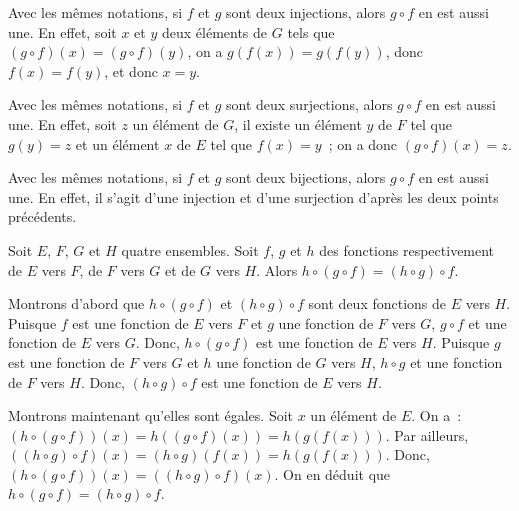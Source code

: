 \done

\blank[medium]

\noindent{} Avec les mêmes notations, si $f$ et $g$ sont deux injections, alors $g \circ f$ en est aussi une. 
    En effet, soit $x$ et $y$ deux éléments de $G$ tels que $(g \circ f)(x) = (g \circ f)(y)$, on a $g(f(x)) = g(f(y))$, donc $f(x) = f(y)$, et donc $x = y$.

\blank[medium]

\noindent{} Avec les mêmes notations, si $f$ et $g$ sont deux surjections, alors $g \circ f$ en est aussi une. 
    En effet, soit $z$ un élément de $G$, il existe un élément $y$ de $F$ tel que $g(y) = z$ et un élément $x$ de $E$ tel que $f(x) = y$ ; on a donc $(g \circ f)(x) = z$.

\blank[medium]

\noindent{} Avec les mêmes notations, si $f$ et $g$ sont deux bijections, alors $g \circ f$ en est aussi une. 
    En effet, il s'agit d'une injection et d'une surjection d'après les deux points précédents.

\blank[medium]

\noindent{} Soit $E$, $F$, $G$ et $H$ quatre ensembles. 
    Soit $f$, $g$ et $h$ des fonctions respectivement de $E$ vers $F$, de $F$ vers $G$ et de $G$ vers $H$. 
    Alors $h \circ (g \circ f) = (h \circ g) \circ f$.

\blank[medium]

\noindent{} Montrons d'abord que $h \circ (g \circ f)$ et $(h \circ g) \circ f$ sont deux fonctions de $E$ vers $H$. 
    Puisque $f$ est une fonction de $E$ vers $F$ et $g$ une fonction de $F$ vers $G$, $g \circ f$ et une fonction de $E$ vers $G$. 
    Donc, $h \circ (g \circ f)$ est une fonction de $E$ vers $H$.
    Puisque $g$ est une fonction de $F$ vers $G$ et $h$ une fonction de $G$ vers $H$, $h \circ g$ et une fonction de $F$ vers $H$. 
    Donc, $(h \circ g) \circ f$ est une fonction de $E$ vers $H$. 

    Montrons maintenant qu'elles sont égales. 
    Soit $x$ un élément de $E$. 
    On a : $(h \circ (g \circ f))(x) = h((g \circ f)(x)) = h(g(f(x)))$.
    Par ailleurs, $((h \circ g) \circ f)(x) = (h \circ g)(f(x)) = h(g(f(x)))$. 
    Donc, $(h \circ (g \circ f))(x) = ((h \circ g) \circ f)(x)$.
    On en déduit que $h \circ (g \circ f) = (h \circ g) \circ f$.

   \done 

